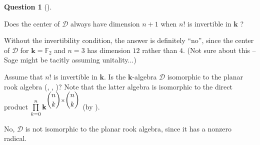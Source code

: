 \documentclass[numbers=enddot,12pt,final,onecolumn,notitlepage]{scrartcl}%
\numberwithin{exer}{subsection}
\theoremstyle{definition}
\newtheorem{quest}[theo]{Question}
\newenvironment{question}[1][]
{\begin{quest}[#1]\begin{leftbar}}
{\end{leftbar}\end{quest}}
\newenvironment{question}[1][Question]{\noindent\textbf{#1.} }{\ \rule{0.5em}{0.5em}}
\let\prodnonlimits\prod
\renewcommand{\prod}{\prodnonlimits\limits}
\newenvironment{noncompile}{}{}
\begin{document}
\begin{question}
Does the center of $\mathcal{D}$ always have dimension $n+1$ when $n!$ is
invertible in $\mathbf{k}$ ?
\end{question}

\begin{noncompile}
Without the invertibility condition, the answer is definitely
\textquotedblleft no\textquotedblright, since the center of $\mathcal{D}$ for
$\mathbf{k}=\mathbb{F}_{2}$ and $n=3$ has dimension $12$ rather than $4$. (Not
sure about this -- Sage might be tacitly assuming unitality...)
\end{noncompile}

\begin{noncompile}
Assume that $n!$ is invertible in $\mathbf{k}$. Is the $\mathbf{k}$-algebra
$\mathcal{D}$ isomorphic to the planar rook algebra (\cite[\S 3]{FlHaHe09},
\cite[\S 2.2]{PotRub20}, \cite[\S 4.3]{Scrims22})? Note that the latter
algebra is isomorphic to the direct product $\prod_{k=0}^{n}\mathbf{k}%
^{\dbinom{n}{k}\times\dbinom{n}{k}}$ (by \cite[Corollary 3.4]{FlHaHe09}).

No, $\mathcal{D}$ is not isomorphic to the planar rook algebra, since it has a
nonzero radical.
\end{noncompile}
\end{document}
